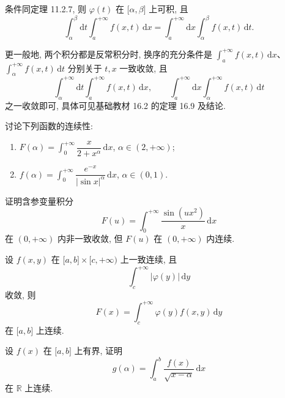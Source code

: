 \documentclass[../数学分析培优讲义.tex]{subfiles}
\begin{document}
\begin{theorem}
条件同定理 11.2.7, 则 $\varphi(t)$ 在 $\lbrack\alpha,\beta\rbrack$ 上可积, 且
\[
    \int_\alpha^\beta\mathrm{d}t\int_a^{+\infty}f(x,t)\,\mathrm{d}x
    =\int_a^{+\infty}\mathrm{d}x\int_\alpha^\beta f(x,t)\,\mathrm{d}t.
\]
\end{theorem}

\begin{remark}
更一般地, 两个积分都是反常积分时, 换序的充分条件是 $\displaystyle\int_a^{+\infty}f(x,t)\,\mathrm{d}x$、$\displaystyle\int_\alpha^{+\infty}f(x,t)\,\mathrm{d}t$ 分别关于 $t,x$ 一致收敛, 且
\[
    \int_\alpha^{+\infty}\mathrm{d}t\int_a^{+\infty}f(x,t)\,\mathrm{d}x,
    \qquad
    \int_a^{+\infty}\mathrm{d}x\int_\alpha^{+\infty}f(x,t)\,\mathrm{d}t
\]
之一收敛即可, 具体可见基础教材 16.2 的定理 16.9 及结论.
\end{remark}

\begin{example}
讨论下列函数的连续性:
\begin{enumerate}[label=(\arabic*)]
    \item $\displaystyle F(\alpha)=\int_0^{+\infty}\dfrac{x}{2+x^\alpha}\,\mathrm{d}x$, $\alpha\in(2,+\infty)$;
    \item $\displaystyle f(\alpha)=\int_0^{+\infty}\dfrac{e^{-x}}{|\sin x|^\alpha}\,\mathrm{d}x$, $\alpha\in(0,1)$.
\end{enumerate}
\end{example}
\exampleblank

\begin{example}
证明含参变量积分
\[
    F(u)=\int_0^{+\infty}\dfrac{\sin(ux^2)}{x}\,\mathrm{d}x
\]
在 $(0,+\infty)$ 内非一致收敛, 但 $F(u)$ 在 $(0,+\infty)$ 内连续.
\end{example}
\exampleblank

\begin{example}
设 $f(x,y)$ 在 $\lbrack a,b\rbrack\times\lbrack c,+\infty)$ 上一致连续, 且
\[
    \int_c^{+\infty}|\varphi(y)|\,\mathrm{d}y
\]
收敛, 则
\[
    F(x)=\int_c^{+\infty}\varphi(y)f(x,y)\,\mathrm{d}y
\]
在 $\lbrack a,b\rbrack$ 上连续.
\end{example}
\exampleblank

\begin{example}[\markstar]
设 $f(x)$ 在 $\lbrack a,b\rbrack$ 上有界, 证明
\[
    g(\alpha)=\int_a^b\dfrac{f(x)}{\sqrt{x-\alpha}}\,\mathrm{d}x
\]
在 $\mathbb{R}$ 上连续.
\end{example}
\exampleblank
\end{document}
